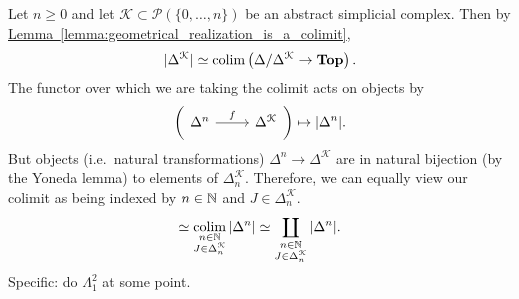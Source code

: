 \documentclass[main.tex]{subfiles}
\begin{document}
%
%
%

\begin{example}
  Let $n \geq 0$ and let $\mathcal{K} \subset \mathcal{P}(\{0, \ldots, n\})$ be an abstract simplicial complex. Then by \hyperref[lemma:geometrical_realization_is_a_colimit]{Lemma~\ref*{lemma:geometrical_realization_is_a_colimit}},
  \begin{equation*}
    |\Delta^{\mathcal{K}}| \simeq \operatorname*{colim}\left( \Delta/\Delta^{\mathcal{K}} \to \mathbf{Top} \right).
  \end{equation*}
  The functor over which we are taking the colimit acts on objects by
  \begin{equation*}
    \left( \begin{tikzcd} \Delta^{n} \arrow[r, "f"] & \Delta^{\mathcal{K}} \end{tikzcd} \right) \mapsto \abs{\Delta^{n}}.
  \end{equation*}
  But objects (i.e.\ natural transformations) $\Delta^{n} \to \Delta^{\mathcal{K}}$ are in natural bijection (by the Yoneda lemma) to elements of $\Delta^{\mathcal{K}}_{n}$. Therefore, we can equally view our colimit as being indexed by $n \in \mathbb{N}$ and $J \in \Delta^{\mathcal{K}}_{n}$.
  \begin{equation*}
    \simeq \operatorname*{colim}_{\substack{n \in \mathbb{N} \\ J \in \Delta^{\mathcal{K}}_{n}}} {| \Delta^{n} |} \simeq \coprod_{\substack{n \in \mathbb{N} \\ J \in \Delta^{\mathcal{K}}_{n}}} {| \Delta^{n} |}.
  \end{equation*}
  Specific: do $\Lambda^{2}_{1}$ at some point.
\end{example}
\end{document}
